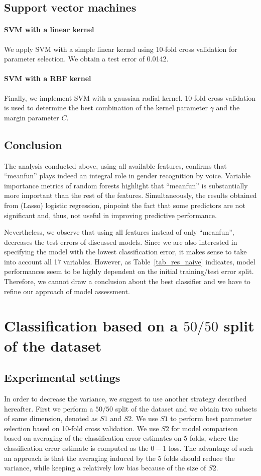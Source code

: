 \subsection{Support vector machines}
\paragraph{SVM with a linear kernel}
We apply SVM with a simple linear kernel using \num{10}-fold cross validation for parameter selection. We obtain a test error of \num{0.0142}.
\paragraph{SVM with a RBF kernel}
Finally, we implement SVM with a gaussian radial kernel. \num{10}-fold cross validation is used to determine the best combination of the kernel parameter $ \gamma $ and the margin parameter $C$. 
\subsection{Conclusion}
The analysis conducted above, using all available features, confirms that ``meanfun'' plays indeed an integral role in gender recognition by voice. Variable importance metrics of random forests highlight that ``meanfun'' is substantially more important than the rest of the features. Simultaneously, the results obtained from (Lasso) logistic regression, pinpoint the fact that some predictors are not significant and, thus, not useful in improving predictive performance.

Nevertheless, we observe that using all features instead of only ``meanfun'', decreases the test errors of discussed models. Since we are also interested in specifying the model with the lowest classification error, it makes sense to take into account all \num{17} variables. However, as Table~\ref{tab_res_naive} indicates, model performances seem to be highly dependent on the initial training/test error split. Therefore, we cannot draw a conclusion about the best classifier and we have to refine our approach of model assessment.
\section{Classification based on a $50/50$ split of the dataset}
\label{sec_our_strat}
\subsection{Experimental settings}
In order to decrease the variance, we suggest to use another strategy described hereafter. 
First we perform a $50/50$ split of the dataset and we obtain two subsets of same dimension, denoted as $S1$ and $S2$.
We use $S1$ to perform best parameter selection based on \num{10}-fold cross validation.
We use $S2$ for model comparison based on averaging of the classification error estimates on \num{5} folds, where the classification error estimate is computed as the $0-1$ loss. 
The advantage of such an approach is that the averaging induced by the \num{5} folds should reduce the variance, while keeping a relatively low bias because of the size of $S2$. 

